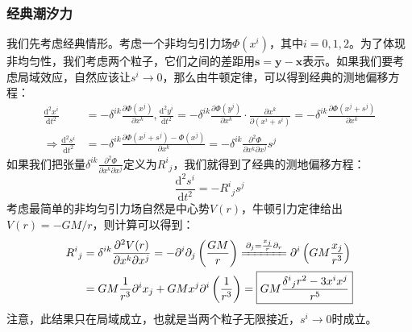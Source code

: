 \documentclass[hyperref, UTF8, a4paper]{ctexart}
\begin{document}
\subsubsection{经典潮汐力}
我们先考虑经典情形。考虑一个非均匀引力场$\Phi (x^{i} )$，其中$i=0,1,2$。为了体现非均匀性，我们考虑两个粒子，它们之间的差距用$\boldsymbol{s} =\boldsymbol{y} - \boldsymbol{x}$表示。如果我们要考虑局域效应，自然应该让$s^{i}\rightarrow 0$，那么由牛顿定律，可以得到经典的测地偏移方程：
\begin{equation*}
	\begin{aligned}
		\frac{\mathrm{d}^{2} x^{i}}{\mathrm{d} t^{2}} & =-\delta ^{ik}\frac{\partial \Phi (x^{j} )}{\partial x^{k}} ,\frac{\mathrm{d}^{2} y^{i}}{\mathrm{d} t^{2}} =-\delta ^{ik}\frac{\partial \Phi (y^{j} )}{\partial x^{k}} \cdot \frac{\partial x^{k}}{\partial (x^{i} +s^{i} )} =-\delta ^{ik}\frac{\partial \Phi (x^{j} +s^{j} )}{\partial x^{k}}\\
		\Rightarrow \frac{\mathrm{d}^{2} s^{i}}{\mathrm{d} t^{2}} & =-\delta ^{ik}\frac{\partial \Phi (x^{j} +s^{j} )-\Phi (x^{j} )}{\partial x^{k}} =-\delta ^{ik}\frac{\partial ^{2} \Phi }{\partial x^{k} \partial x^{j}} s^{j}
	\end{aligned}
\end{equation*}
如果我们把张量$\delta ^{ik}\frac{\partial ^{2} \Phi }{\partial x^{k} \partial x^{j}}$定义为$R^{i}{}_{j}$，我们就得到了经典的测地偏移方程：
\begin{equation}
	\frac{\mathrm{d}^{2} s^{i}}{\mathrm{d} t^{2}} =-R^{i}{}_{j} s^{j}
	\label{GD classic}
\end{equation}
考虑最简单的非均匀引力场自然是中心势$V( r)$，牛顿引力定律给出$V( r) =-GM/r$，则计算可以得到：
\begin{equation*}
	\begin{aligned}
		R^{i}{}_{j} & =\delta ^{ik}\frac{\partial ^{2} V( r)}{\partial x^{k} \partial x^{j}} =-\partial ^{i} \partial _{j}\left(\frac{GM}{r}\right)\xlongequal{\partial _{j} =\frac{x_{j}}{r} \partial _{r}} \partial ^{i}\left( GM\frac{x_{j}}{r^{3}}\right)\\
		& =GM\frac{1}{r^{3}} \partial ^{i} x_{j} +GMx^{j} \partial ^{i}\left(\frac{1}{r^{3}}\right) =\boxed{GM\frac{\delta ^{i}{}_{j} r^{2} -3x^{i} x^{j}}{r^{5}}}
	\end{aligned}
\end{equation*}
注意，此结果只在局域成立，也就是当两个粒子无限接近，$s^{i}\rightarrow 0$时成立。
\end{document}
